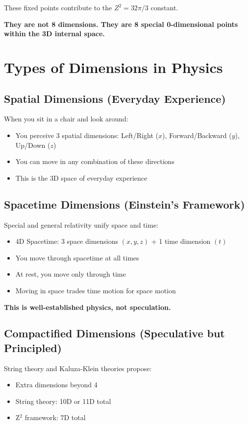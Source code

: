 \documentclass[12pt,a4paper]{article}
\begin{document}
These fixed points contribute to the $Z^2 = 32\pi/3$ constant.

\textbf{They are not 8 dimensions. They are 8 special 0-dimensional points within the 3D internal space.}

\section{Types of Dimensions in Physics}

\subsection{Spatial Dimensions (Everyday Experience)}

When you sit in a chair and look around:
\begin{itemize}
\item You perceive 3 spatial dimensions: Left/Right ($x$), Forward/Backward ($y$), Up/Down ($z$)
\item You can move in any combination of these directions
\item This is the 3D space of everyday experience
\end{itemize}

\subsection{Spacetime Dimensions (Einstein's Framework)}

Special and general relativity unify space and time:
\begin{itemize}
\item 4D Spacetime: 3 space dimensions $(x, y, z)$ + 1 time dimension $(t)$
\item You move through spacetime at all times
\item At rest, you move only through time
\item Moving in space trades time motion for space motion
\end{itemize}

\textbf{This is well-established physics, not speculation.}

\subsection{Compactified Dimensions (Speculative but Principled)}

String theory and Kaluza-Klein theories propose:
\begin{itemize}
\item Extra dimensions beyond 4
\item String theory: 10D or 11D total
\item Z$^2$ framework: 7D total
\end{itemize}
\end{document}
